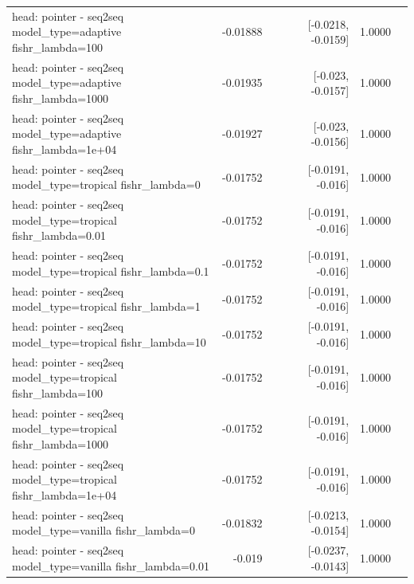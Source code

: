 \documentclass[10pt]{article}
\makeatletter
\newcommand{\stackcell}[1]{\begin{tabular}[t]{@{}l@{}}#1\end{tabular}}
\makeatother
\begin{document}
{\begin{longtable}{lrrrl}
\stackcell{head: pointer - seq2seq\\\footnotesize model\_type=adaptive fishr\_lambda=100 } & -0.01888 & [-0.0218, -0.0159] & 1.0000 & \\
\stackcell{head: pointer - seq2seq\\\footnotesize model\_type=adaptive fishr\_lambda=1000 } & -0.01935 & [-0.023, -0.0157] & 1.0000 & \\
\stackcell{head: pointer - seq2seq\\\footnotesize model\_type=adaptive fishr\_lambda=1e+04 } & -0.01927 & [-0.023, -0.0156] & 1.0000 & \\
\stackcell{head: pointer - seq2seq\\\footnotesize model\_type=tropical fishr\_lambda=0 } & -0.01752 & [-0.0191, -0.016] & 1.0000 & \\
\stackcell{head: pointer - seq2seq\\\footnotesize model\_type=tropical fishr\_lambda=0.01 } & -0.01752 & [-0.0191, -0.016] & 1.0000 & \\
\stackcell{head: pointer - seq2seq\\\footnotesize model\_type=tropical fishr\_lambda=0.1 } & -0.01752 & [-0.0191, -0.016] & 1.0000 & \\
\stackcell{head: pointer - seq2seq\\\footnotesize model\_type=tropical fishr\_lambda=1 } & -0.01752 & [-0.0191, -0.016] & 1.0000 & \\
\stackcell{head: pointer - seq2seq\\\footnotesize model\_type=tropical fishr\_lambda=10 } & -0.01752 & [-0.0191, -0.016] & 1.0000 & \\
\stackcell{head: pointer - seq2seq\\\footnotesize model\_type=tropical fishr\_lambda=100 } & -0.01752 & [-0.0191, -0.016] & 1.0000 & \\
\stackcell{head: pointer - seq2seq\\\footnotesize model\_type=tropical fishr\_lambda=1000 } & -0.01752 & [-0.0191, -0.016] & 1.0000 & \\
\stackcell{head: pointer - seq2seq\\\footnotesize model\_type=tropical fishr\_lambda=1e+04 } & -0.01752 & [-0.0191, -0.016] & 1.0000 & \\
\stackcell{head: pointer - seq2seq\\\footnotesize model\_type=vanilla fishr\_lambda=0 } & -0.01832 & [-0.0213, -0.0154] & 1.0000 & \\
\stackcell{head: pointer - seq2seq\\\footnotesize model\_type=vanilla fishr\_lambda=0.01 } & -0.019 & [-0.0237, -0.0143] & 1.0000 & \\

\end{longtable}}
\end{document}
